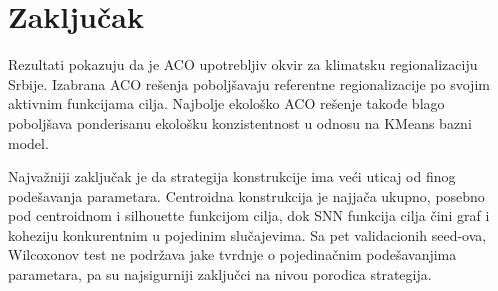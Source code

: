 \documentclass[11pt]{article}
\begin{document}
\section*{Zaključak}

Rezultati pokazuju da je ACO upotrebljiv okvir za klimatsku regionalizaciju Srbije. Izabrana ACO rešenja poboljšavaju referentne regionalizacije po svojim aktivnim funkcijama cilja. Najbolje ekološko ACO rešenje takođe blago poboljšava ponderisanu ekološku konzistentnost u odnosu na KMeans bazni model.

Najvažniji zaključak je da strategija konstrukcije ima veći uticaj od finog podešavanja parametara. Centroidna konstrukcija je najjača ukupno, posebno pod centroidnom i silhouette funkcijom cilja, dok SNN funkcija cilja čini graf i koheziju konkurentnim u pojedinim slučajevima. Sa pet validacionih seed-ova, Wilcoxonov test ne podržava jake tvrdnje o pojedinačnim podešavanjima parametara, pa su najsigurniji zaključci na nivou porodica strategija.
\end{document}
